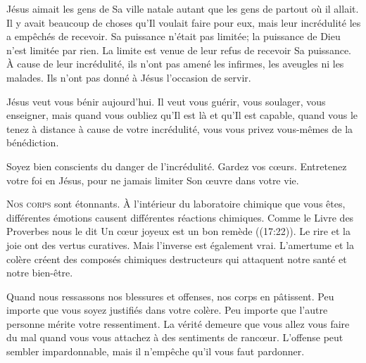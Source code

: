 
Jésus aimait les gens de Sa ville natale autant que les gens
 de partout où il allait. Il y avait beaucoup de choses
 qu'Il voulait faire pour eux, mais leur incrédulité
 les a empêchés de recevoir. Sa puissance n'était pas limitée;
 la puissance de Dieu n'est limitée par rien.
 La limite est venue de leur refus de recevoir Sa puissance.
 À cause de leur incrédulité, ils n'ont pas amené les infirmes,
 les aveugles ni les malades. Ils n'ont pas donné à Jésus l'occasion de servir.

Jésus veut vous bénir aujourd'hui. Il veut vous guérir, vous soulager,
 vous enseigner, mais quand vous oubliez qu'Il est là et qu'Il est capable,
 quand vous le tenez à distance à cause de votre incrédulité,
 vous vous privez vous-mêmes de la bénédiction.

Soyez bien conscients du danger de l'incrédulité. Gardez vos c\oe{}urs.
 Entretenez votre foi en Jésus,
 pour ne jamais limiter Son \oe{}uvre dans votre vie.

\dvrule






\lettrine{N}{os corps} sont étonnants. À l'intérieur du laboratoire
 chimique que vous êtes, différentes émotions causent différentes
 réactions chimiques. Comme le Livre des Proverbes nous le dit\frcolon{} 
 \Og Un c\oe{}ur joyeux est un bon remède \Fg{} ((17:22)).
 Le rire et la joie ont des vertus curatives.
 Mais l'inverse est également vrai. L'amertume et la colère
 créent des composés chimiques destructeurs qui attaquent
 notre santé et notre bien-être.


Quand nous ressassons nos blessures et offenses, nos corps en pâtissent.
 Peu importe que vous soyez justifiés dans votre colère.
 Peu importe que l'autre personne mérite votre ressentiment.
 La vérité demeure que vous allez vous faire du mal quand vous vous
 attachez à des sentiments de ranc\oe{}ur.
 L'offense peut sembler impardonnable,
 mais il n'empêche qu'il vous faut pardonner.

